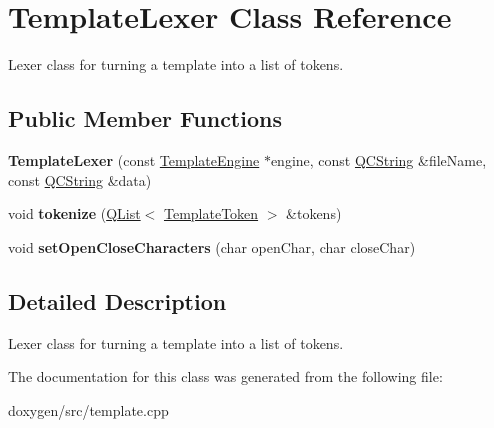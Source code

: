 \hypertarget{class_template_lexer}{}\section{Template\+Lexer Class Reference}
\label{class_template_lexer}


Lexer class for turning a template into a list of tokens.  


\subsection*{Public Member Functions}
\begin{DoxyCompactItemize}
\item 
\mbox{\label{class_template_lexer_a66516554b1836bbf3e98dec5650964ee}} 
{\bfseries Template\+Lexer} (const \mbox{\hyperlink{class_template_engine}{Template\+Engine}} $\ast$engine, const \mbox{\hyperlink{class_q_c_string}{Q\+C\+String}} \&file\+Name, const \mbox{\hyperlink{class_q_c_string}{Q\+C\+String}} \&data)
\item 
\mbox{\label{class_template_lexer_a247c8f311963a10ee5dba15c3e24347e}} 
void {\bfseries tokenize} (\mbox{\hyperlink{class_q_list}{Q\+List}}$<$ \mbox{\hyperlink{class_template_token}{Template\+Token}} $>$ \&tokens)
\item 
\mbox{\label{class_template_lexer_a725375d2d2c117ac98aa2191c09749a7}} 
void {\bfseries set\+Open\+Close\+Characters} (char open\+Char, char close\+Char)
\end{DoxyCompactItemize}


\subsection{Detailed Description}
Lexer class for turning a template into a list of tokens. 

The documentation for this class was generated from the following file\+:\begin{DoxyCompactItemize}
\item 
doxygen/src/template.\+cpp\end{DoxyCompactItemize}
